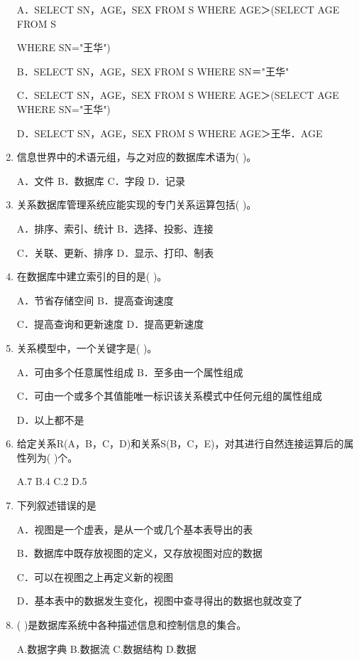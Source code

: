 \documentclass{article}
\begin{document}
\begin{enumerate}
A．SELECT SN，AGE，SEX FROM S WHERE AGE＞(SELECT AGE FROM S

WHERE SN="王华")

B．SELECT SN，AGE，SEX FROM S WHERE SN＝"王华"

C．SELECT SN，AGE，SEX FROM S WHERE AGE＞(SELECT AGE WHERE SN="王华")

D．SELECT SN，AGE，SEX FROM S WHERE AGE＞王华．AGE

\item 信息世界中的术语元组，与之对应的数据库术语为( )。

A．文件 B．数据库 C．字段 D．记录

\item 关系数据库管理系统应能实现的专门关系运算包括( )。

A．排序、索引、统计 B．选择、投影、连接

C．关联、更新、排序 D．显示、打印、制表

\item 在数据库中建立索引的目的是( )。

A．节省存储空间 B．提高查询速度

C．提高查询和更新速度 D．提高更新速度

\item 关系模型中，一个关键字是( )。

A．可由多个任意属性组成 B．至多由一个属性组成

C．可由一个或多个其值能唯一标识该关系模式中任何元组的属性组成

D．以上都不是

\item 给定关系R(A，B，C，D)和关系S(B，C，E)，对其进行自然连接运算后的属性列为( )个。

A.7 B.4 C.2 D.5

\item 下列叙述错误的是

A．视图是一个虚表，是从一个或几个基本表导出的表

B．数据库中既存放视图的定义，又存放视图对应的数据

C．可以在视图之上再定义新的视图

D．基本表中的数据发生变化，视图中查寻得出的数据也就改变了

\item ( )是数据库系统中各种描述信息和控制信息的集合。

A.数据字典 B.数据流 C.数据结构 D.数据
\end{enumerate}
\end{document}
